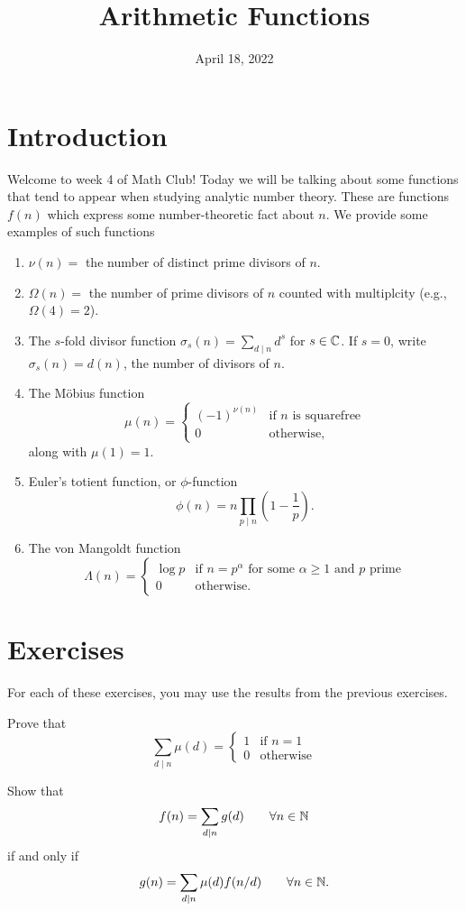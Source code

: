 \documentclass{article}
\title{Arithmetic Functions}
\author{}
\date{April 18, 2022}
\begin{document}
\section{Introduction}

Welcome to week 4 of Math Club!
Today we will be talking about some functions that tend to appear when studying analytic number theory.
These are functions \(f(n)\) which express some number-theoretic fact about \(n\).
We provide some examples of such functions
\begin{enumerate}
    \item \(\nu(n) =\) the number of distinct prime divisors of \(n\).
    \item \(\Omega(n) =\) the number of prime divisors of \(n\) counted with multiplcity (e.g., \(\Omega(4)=2\)).
    \item The \(s\)-fold divisor function \(\sigma_s(n) = \sum_{d\mid n}d^s\) for \(s\in\mathbb{C}\). If \(s=0\), write \(\sigma_s(n)=d(n)\), the number of divisors of \(n\).
    \item The M\"obius function 
    \[\mu(n) = \begin{cases}
        (-1)^{\nu(n)} & \textrm{if }n\textrm{ is squarefree}\\
        0 & \textrm{otherwise,}
    \end{cases}\]
    along with \(\mu(1)=1\).
    \item Euler's totient function, or \(\phi\)-function
    \[\phi(n) = n\prod_{p\mid n}\left(1-\frac{1}{p}\right).\]
    \item The von Mangoldt function
    \[\Lambda(n) = \begin{cases}
        \log p & \textrm{if }n=p^\alpha\textrm{ for some }\alpha\geq 1\textrm{ and }p\textrm{ prime}\\
        0 & \textrm{otherwise.}
    \end{cases}\]
\end{enumerate}

\section{Exercises}

For each of these exercises, you may use the results from the previous exercises.

\begin{exercise}
    Prove that
    \[\sum_{d\mid n}\mu(d)=\begin{cases}
        1 & \textrm{if }n=1\\
        0 & \textrm{otherwise}
    \end{cases}\]
\end{exercise}

\begin{exercise}
    Show that
    \[f(n) = \sum_{d\mid n}g(d)\qquad \forall n\in\mathbb{N}\]
    if and only if
    \[g(n) = \sum_{d\mid n}\mu(d)f(n/d)\qquad \forall n\in\mathbb{N}.\]
\end{exercise}
\end{document}
